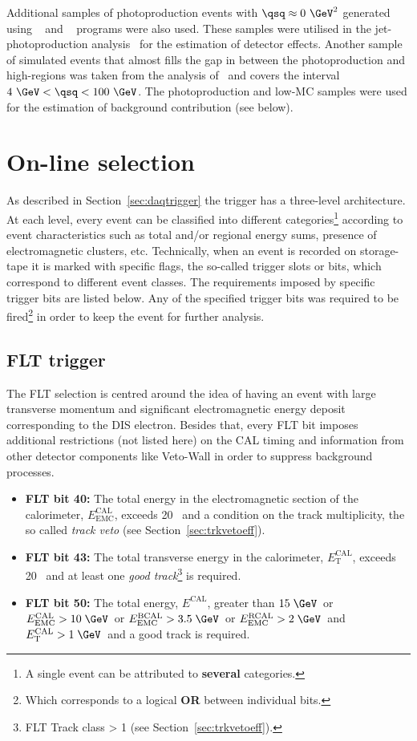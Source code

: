 Additional samples of photoproduction events with $\qsq\approx 0~\GeV^2$ generated using \herwig~\cite{cpc:67:465, jhep01:2001:010} and \pythia~\cite{cpc:82:74} programs were also used. These samples were utilised in the jet-photoproduction analysis~\cite{np:b864:1} for the estimation of detector effects. Another sample of simulated events that almost fills the gap in \qsq between the photoproduction and high-\qsq regions was taken from the analysis of~\cite{thesis:perrey:2011} and covers the interval $4~\GeV<\qsq<100~\GeV$. The photoproduction and low-\qsq MC samples were used for the estimation of background contribution (see below).

\section{On-line selection}
\label{sec:onlineselect}
As described in Section~\ref{sec:daqtrigger} the \zeus trigger has a three-level architecture. At each level, every event can be classified into different categories\footnote{A single event can be attributed to \textbf{several} categories.} according to event characteristics such as total and/or regional energy sums, presence of electromagnetic clusters, etc. Technically, when an event is recorded on storage-tape it is marked with specific flags, the so-called trigger slots or bits, which correspond to different event classes. The requirements imposed by specific trigger bits are listed below. Any of the specified trigger bits was required to be fired\footnote{Which corresponds to a logical \textbf{OR} between individual bits.} in order to keep the event for further analysis. 

\subsection{FLT trigger}
\label{subsec:fltcuts}
The FLT selection is centred around the idea of having an event with large transverse momentum and significant electromagnetic energy deposit corresponding to the DIS electron. Besides that, every FLT bit imposes additional restrictions (not listed here) on the CAL timing and information from other detector components like Veto-Wall in order to suppress background processes.
\begin{itemize}
	\item \textbf{FLT bit 40:} The total energy in the electromagnetic section of the calorimeter, $E_\text{EMC}^\text{CAL}$, exceeds 20 \GeV\, and a condition on the track multiplicity, the so called \textit{track veto} (see Section~\ref{sec:trkvetoeff}).
	\item \textbf{FLT bit 43:} The total transverse energy in the calorimeter, $E_\text{T}^\text{CAL}$, exceeds 20 \GeV\, and at least one \textit{good track}\footnote{FLT Track class > 1 (see Section~\ref{sec:trkvetoeff}).} is required.
	\item \textbf{FLT bit 50:} The total energy, $E^\text{CAL}$, greater than $15\; \GeV$\, or $E_\text{EMC}^\text{CAL} > 10\; \GeV\,$ or $E_\text{EMC}^\text{BCAL} > 3.5\; \GeV$\, or $E_\text{EMC}^\text{RCAL} > 2\; \GeV$\, and $E_\text{T}^\text{CAL} > 1\; \GeV$\, and a good track is required.
\end{itemize}

